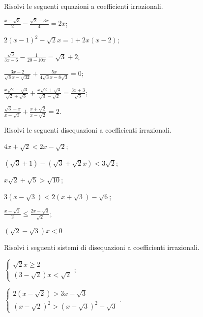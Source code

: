 \begin{esercizio}[\Ast]
 \label{ese:2.103}
Risolvi le seguenti equazioni a coefficienti irrazionali.
 \begin{multicols}{2}
 \begin{enumeratea}
 \item $\frac{x-\sqrt 3} 2-\frac{\sqrt 2-3x} 4=2x$;
 \item $2(x-1)^2-\sqrt 2x=1+2x(x-2)$;
 \item $\frac{\sqrt 3}{3x-6}-\frac 1{20-10x}=\sqrt 3+2$;
 \item $\frac{3x-2}{\sqrt 8x-\sqrt{32}}+\frac{5x}{4\sqrt 3x-8\sqrt 3}=0$;
 \item $\frac{x\sqrt 2-\sqrt 3}{\sqrt 2+\sqrt 3}+\frac{x\sqrt 2+\sqrt 3}{\sqrt 3-\sqrt 2}=\frac{3x+3}{\sqrt 3}$;
\item $\frac{\sqrt 3+x}{x-\sqrt 3}+\frac{x+\sqrt 2}{x-\sqrt 2}=2$.
 \end{enumeratea}
 \end{multicols}
\end{esercizio}

\begin{esercizio}[\Ast]
 \label{ese:2.104}
Risolvi le seguenti disequazioni a coefficienti irrazionali.
 \begin{multicols}{2}
 \begin{enumeratea}
 \item $4x+\sqrt 2<2x-\sqrt 2$;
 \item $(\sqrt 3+1)-(\sqrt 3+\sqrt 2x)<3\sqrt 2$;
 \item $x\sqrt 2+\sqrt 5>\sqrt{10}$;
 \item $3(x-\sqrt 3)<2(x+\sqrt 3)-\sqrt 6$;
 \item $\frac{x-\sqrt 2} 2\le \frac{2x-\sqrt 3}{\sqrt 2}$;
 \item $(\sqrt 2-\sqrt 3)x<0$
 \end{enumeratea}
 \end{multicols}
\end{esercizio}

\begin{esercizio}[\Ast]
 \label{ese:2.105}
Risolvi i seguenti sistemi di disequazioni a coefficienti irrazionali.
 \begin{multicols}{2}
 \begin{enumeratea}
 \item $\left\{\begin{array}{l}\sqrt 2x\ge 2\\
 (3-\sqrt 2)x<\sqrt 2 \end{array}\right.;$
 \item $\left\{\begin{array}{l}2(x-\sqrt 2)>3x-\sqrt 3\\
 (x-\sqrt 2)^2>(x-\sqrt 3)^2-\sqrt 3 \end{array}\right..$
 \end{enumeratea}
 \end{multicols}
\end{esercizio}

